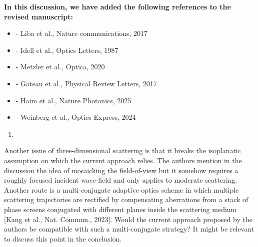 \documentclass[12pt]{article}
\newenvironment{solved_reviewercomment}
    {\begin{tcolorbox}[width=\linewidth,colback=gray!5,colframe=solved_commentcolor!50,title=Reviewer Comment,left=5pt,right=5pt]}
    {\end{tcolorbox}}
\newenvironment{ourresponse}
    {\begin{tcolorbox}[width=\linewidth,breakable,enhanced,colback=gray!5,colframe=responsecolor!50,title=Response,left=5pt,right=5pt]}
    {\end{tcolorbox}}
\begin{document}
\begin{ourresponse}
\textbf{In this discussion, we have added the following references to the revised manuscript:}
\begin{itemize}[nosep]
\item \cite{liba2017speckle} - Liba et al., Nature communications, 2017
\item \cite{idell1987image} - Idell et al., Optics Letters, 1987
\item \cite{metzler2020deepinverse} - Metzler et al., Optica, 2020
\item \cite{gateau2017complementary} - Gateau et al., Physical Review Letters, 2017
\item \cite{haim2025image} - Haim et al., Nature Photonics, 2025
\item \cite{weinberg2024ptychographic} - Weinberg et al., Optics Express, 2024
\end{itemize}

\end{ourresponse}


\begin{enumerate}[label=\arabic*., resume]
\item \leavevmode
\end{enumerate}
\vspace{-1em}
\begin{solved_reviewercomment}
    Another issue of three-dimensional scattering is that it breaks the isoplanatic assumption on which the current approach relies. The authors mention in the discussion the idea of mosaicking the field-of-view but it somehow requires a roughly focused incident wave-field and only applies to moderate scattering. Another route is a multi-conjugate adaptive optics scheme in which multiple scattering trajectories are rectified by compensating aberrations from a stack of phase screens conjugated with different planes inside the scattering medium [Kang et al., Nat. Commun., 2023]. Would the current approach proposed by the authors be compatible with such a multi-conjugate strategy? It might be relevant to discuss this point in the conclusion.
\end{solved_reviewercomment}
\end{document}
